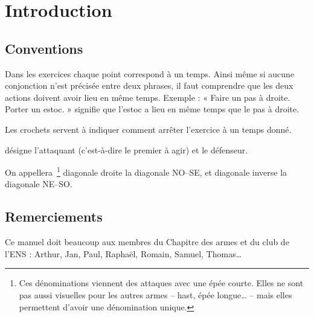 \chapter{Introduction}

\section{Conventions}

Dans les exercices chaque point correspond à un temps. Ainsi même si aucune conjonction n'est précisée entre deux phrases, il faut comprendre que les deux actions doivent avoir lieu en même temps. Exemple : « Faire un pas à droite. Porter un estoc. » signifie que l'estoc a lieu en même temps que le pas à droite.

Les crochets servent à indiquer comment arrêter l'exercice à un temps donné.

\A désigne l'attaquant (c'est-à-dire le premier à agir) et \D le défenseur.

On appellera~\footnote{Ces dénominations viennent des attaques avec une épée courte. Elles ne sont pas aussi visuelles pour les autres armes – hast, épée longue… – mais elles permettent d'avoir une dénomination unique.} diagonale droite la diagonale NO–SE, et diagonale inverse la diagonale NE–SO.

\section{Remerciements}

Ce manuel doit beaucoup aux membres du Chapitre des armes et du club de l'ENS : Arthur, Jan, Paul, Raphaël, Romain, Samuel, Thomas…
